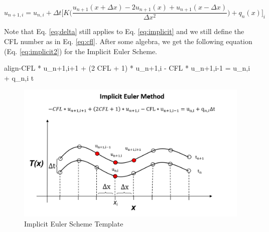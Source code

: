 \documentclass[10pt, letter, showtrims]{extarticle}
\newcommand{\boxedeq}[2]{\begin{empheq}[box={\fboxsep=6pt\fbox}]{align}\label{#1}#2\end{empheq}}
\begin{document}
		\begin{equation}
			u_{n+1,i} = u_{n,i} + \Delta t \big[ K \big(\frac{u_{n+1}(x + \Delta x) - 2 u_{n+1} (x) + u_{n+1} (x - \Delta x)}{\Delta x^{2}} \big) + q_{n}(x)\big]_{i}
		\end{equation}
	
		\noindent
		Note that Eq. \ref{eq:delta} still applies to Eq. \ref{eq:implicit} and we still define the CFL number as in Eq. \ref{eq:cfl}. After some algebra, we get the following equation (Eq. \ref{eq:implicit2}) for the Implicit Euler Scheme.
		
%		
%		
%		
%		
%		
		
		\boxedeq{eq:implicit2}{-CFL * u_{n+1,i+1} + (2 CFL + 1) * u_{n+1,i} - CFL * u_{n+1,i-1} = u_{n,i} + q_{n,i} \Delta t}
		
		\FloatBarrier
		\begin{figure}[h]
			\centering
			\captionsetup{justification=centering}
			\includegraphics[width=0.75\linewidth]{"Figures/Implicit_Euler_Method"}
			\caption{Implicit Euler Scheme Template}
			\label{fig:implicit}
		\end{figure}
		\FloatBarrier
		
\end{document}
